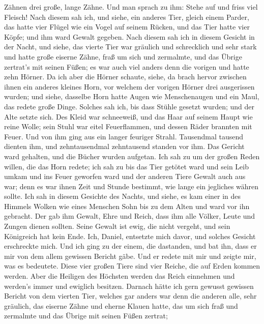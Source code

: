 Zähnen drei große, lange Zähne. Und man sprach zu ihm: Stehe auf und
friss viel Fleisch!  Nach diesem sah ich, und siehe, ein
anderes Tier, gleich einem Parder, das hatte vier Flügel wie ein Vogel
auf seinem Rücken, und das Tier hatte vier Köpfe; und ihm ward Gewalt
gegeben.  Nach diesem sah ich in diesem Gesicht in der
Nacht, und siehe, das vierte Tier war gräulich und schrecklich und sehr
stark und hatte große eiserne Zähne, fraß um sich und zermalmte, und das
Übrige zertrat's mit seinen Füßen; es war auch viel anders denn die
vorigen und hatte zehn Hörner.  Da ich aber die Hörner
schaute, siehe, da brach hervor zwischen ihnen ein anderes kleines Horn,
vor welchem der vorigen Hörner drei ausgerissen wurden; und siehe,
dasselbe Horn hatte Augen wie Menschenaugen und ein Maul, das redete
große Dinge.  Solches sah ich, bis dass Stühle gesetzt
wurden; und der Alte setzte sich. Des Kleid war schneeweiß, und das Haar
auf seinem Haupt wie reine Wolle; sein Stuhl war eitel Feuerflammen, und
dessen Räder brannten mit Feuer.  Und von ihm ging aus ein
langer feuriger Strahl. Tausendmal tausend dienten ihm, und
zehntausendmal zehntausend standen vor ihm. Das Gericht ward gehalten,
und die Bücher wurden aufgetan.  Ich sah zu um der großen
Reden willen, die das Horn redete; ich sah zu bis das Tier getötet ward
und sein Leib umkam und ins Feuer geworfen ward  und der
anderen Tiere Gewalt auch aus war; denn es war ihnen Zeit und Stunde
bestimmt, wie lange ein jegliches währen sollte.  Ich sah
in diesem Gesichte des Nachts, und siehe, es kam einer in des Himmels
Wolken wie eines Menschen Sohn bis zu dem Alten und ward vor ihn
gebracht.  Der gab ihm Gewalt, Ehre und Reich, dass ihm
alle Völker, Leute und Zungen dienen sollten. Seine Gewalt ist ewig, die
nicht vergeht, und sein Königreich hat kein Ende.  Ich,
Daniel, entsetzte mich davor, und solches Gesicht erschreckte mich.
 Und ich ging zu der einem, die dastanden, und bat ihn,
dass er mir von dem allem gewissen Bericht gäbe. Und er redete mit mir
und zeigte mir, was es bedeutete.  Diese vier großen Tiere
sind vier Reiche, die auf Erden kommen werden.  Aber die
Heiligen des Höchsten werden das Reich einnehmen und werden's immer und
ewiglich besitzen.  Darnach hätte ich gern gewusst gewissen
Bericht von dem vierten Tier, welches gar anders war denn die anderen
alle, sehr gräulich, das eiserne Zähne und eherne Klauen hatte, das um
sich fraß und zermalmte und das Übrige mit seinen Füßen zertrat;
